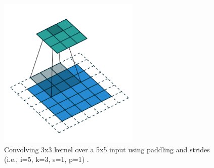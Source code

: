 \\
\begin{figure} [H]
\centering
\includegraphics[width=0.6\textwidth]{figures/Kernel}
\caption{Convolving 3x3 kernel over a 5x5 input using paddling and strides (i.e., i=5, k=3, s=1, p=1) \citep{Dumoulin2016}.}
\label{fig:Kernel}  
\end{figure}
\\

